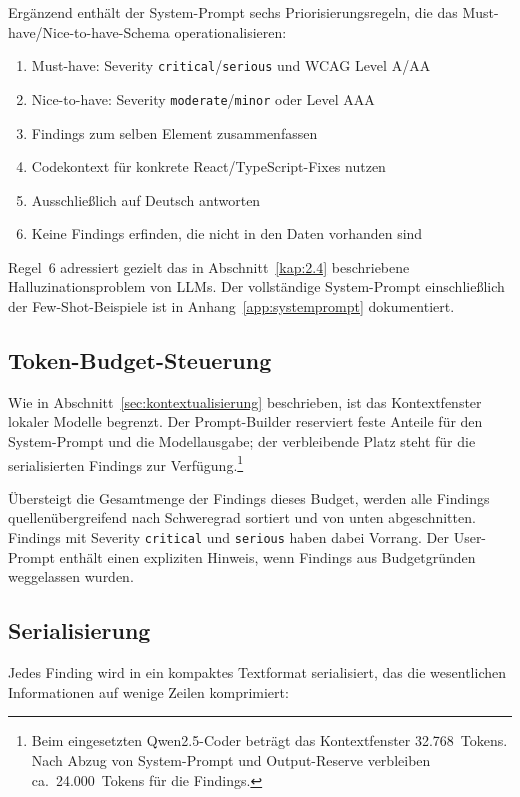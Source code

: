 Ergänzend enthält der System-Prompt sechs Priorisierungsregeln, die das Must-have/Nice-to-have-Schema operationalisieren:

\begin{enumerate}
  \item Must-have: Severity \texttt{critical}/\texttt{serious} und \ac{WCAG} Level A/AA
  \item Nice-to-have: Severity \texttt{moderate}/\texttt{minor} oder Level AAA
  \item Findings zum selben Element zusammenfassen
  \item Codekontext für konkrete React/TypeScript-Fixes nutzen
  \item Ausschließlich auf Deutsch antworten
  \item Keine Findings erfinden, die nicht in den Daten vorhanden sind
\end{enumerate}

Regel~6 adressiert gezielt das in Abschnitt~\ref{kap:2.4} beschriebene Halluzinationsproblem von \ac{LLM}s. Der vollständige System-Prompt einschließlich der Few-Shot-Beispiele ist in Anhang~\ref{app:systemprompt} dokumentiert.

\subsection{Token-Budget-Steuerung}

Wie in Abschnitt~\ref{sec:kontextualisierung} beschrieben, ist das Kontextfenster lokaler Modelle begrenzt. Der Prompt-Builder reserviert feste Anteile für den System-Prompt und die Modellausgabe; der verbleibende Platz steht für die serialisierten Findings zur Verfügung.\footnote{Beim eingesetzten Qwen2.5-Coder beträgt das Kontextfenster 32.768~Tokens. Nach Abzug von System-Prompt und Output-Reserve verbleiben ca.~24.000~Tokens für die Findings.}

Übersteigt die Gesamtmenge der Findings dieses Budget, werden alle Findings quellenübergreifend nach Schweregrad sortiert und von unten abgeschnitten. Findings mit Severity \texttt{critical} und \texttt{serious} haben dabei Vorrang. Der User-Prompt enthält einen expliziten Hinweis, wenn Findings aus Budgetgründen weggelassen wurden.

\subsection{Serialisierung}

Jedes Finding wird in ein kompaktes Textformat serialisiert, das die wesentlichen Informationen auf wenige Zeilen komprimiert:

